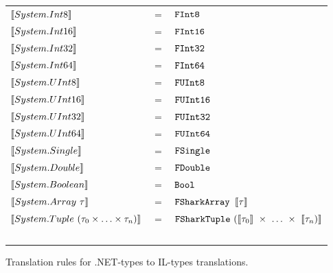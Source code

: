 \begin{figure}
  \centering
\begin{tabular}{@{}l c l}%
  $\llbracket System.Int8 \rrbracket$ & $=$ & $\text{\ttfamily FInt8} $ \\ 
  $\llbracket System.Int16 \rrbracket$ & $=$ & $\text{\ttfamily FInt16}$
  \\
  $\llbracket System.Int32 \rrbracket$ & $=$ & $\text{\ttfamily FInt32} $ \\ 
  $\llbracket System.Int64 \rrbracket$ & $=$ & $\text{\ttfamily FInt64} $
  \\
  $\llbracket System.UInt8 \rrbracket$ & $=$ & $\text{\ttfamily FUInt8} $ \\ 
  $\llbracket System.UInt16 \rrbracket$ & $=$ & $\text{\ttfamily FUInt16} $ 
  \\
  $\llbracket System.UInt32 \rrbracket$ & $=$ & $\text{\ttfamily FUInt32} $ \\ 
  $\llbracket System.UInt64 \rrbracket$ & $=$ & $\text{\ttfamily FUInt64} $ 
  \\
  $\llbracket System.Single \rrbracket$ & $=$ & $\text{\ttfamily FSingle} $ \\ 
  $\llbracket System.Double \rrbracket$ & $=$ & $\text{\ttfamily FDouble} $ 
  \\
  $\llbracket System.Boolean \rrbracket$ & $=$ & $\text{\ttfamily Bool} $ \\ 
  $\llbracket System.Array~\tau \rrbracket$ & $=$ & $\text{\ttfamily {\texttt{FShark}}{}Array }\llbracket \tau \rrbracket$
  \\
  $\llbracket System.Tuple~(\tau_0 \times \ldots \times \tau_n) \rrbracket$ & $=$ & $\text{\ttfamily {\texttt{FShark}}{}Tuple}~(\llbracket \tau_0 \rrbracket~\times~\ldots~\times~\llbracket \tau_n) \rrbracket$ \\ ~ \\
\end{tabular}
\caption{Translation rules for .NET-types to \fshark{}IL-types translations.}
\label{fig:.nettofsharktypes}
\end{figure}

